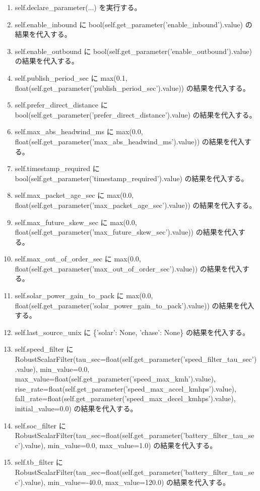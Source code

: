 \documentclass[a4paper,11pt]{article}
\begin{document}
\begin{enumerate}[leftmargin=1.8em]
\item self.declare\_parameter(...) を実行する。
\item self.enable\_inbound に bool(self.get\_parameter('enable\_inbound').value) の結果を代入する。
\item self.enable\_outbound に bool(self.get\_parameter('enable\_outbound').value) の結果を代入する。
\item self.publish\_period\_sec に max(0.1, float(self.get\_parameter('publish\_period\_sec').value)) の結果を代入する。
\item self.prefer\_direct\_distance に bool(self.get\_parameter('prefer\_direct\_distance').value) の結果を代入する。
\item self.max\_abs\_headwind\_ms に max(0.0, float(self.get\_parameter('max\_abs\_headwind\_ms').value)) の結果を代入する。
\item self.timestamp\_required に bool(self.get\_parameter('timestamp\_required').value) の結果を代入する。
\item self.max\_packet\_age\_sec に max(0.0, float(self.get\_parameter('max\_packet\_age\_sec').value)) の結果を代入する。
\item self.max\_future\_skew\_sec に max(0.0, float(self.get\_parameter('max\_future\_skew\_sec').value)) の結果を代入する。
\item self.max\_out\_of\_order\_sec に max(0.0, float(self.get\_parameter('max\_out\_of\_order\_sec').value)) の結果を代入する。
\item self.solar\_power\_gain\_to\_pack に max(0.0, float(self.get\_parameter('solar\_power\_gain\_to\_pack').value)) の結果を代入する。
\item self.last\_source\_unix に \{'solar': None, 'chase': None\} の結果を代入する。
\item self.speed\_filter に RobustScalarFilter(tau\_sec=float(self.get\_parameter('speed\_filter\_tau\_sec').value), min\_value=0.0, max\_value=float(self.get\_parameter('speed\_max\_kmh').value), rise\_rate=float(self.get\_parameter('speed\_max\_accel\_kmhps').value), fall\_rate=float(self.get\_parameter('speed\_max\_decel\_kmhps').value), initial\_value=0.0) の結果を代入する。
\item self.soc\_filter に RobustScalarFilter(tau\_sec=float(self.get\_parameter('battery\_filter\_tau\_sec').value), min\_value=0.0, max\_value=1.0) の結果を代入する。
\item self.tb\_filter に RobustScalarFilter(tau\_sec=float(self.get\_parameter('battery\_filter\_tau\_sec').value), min\_value=-40.0, max\_value=120.0) の結果を代入する。

\end{enumerate}
\end{document}
